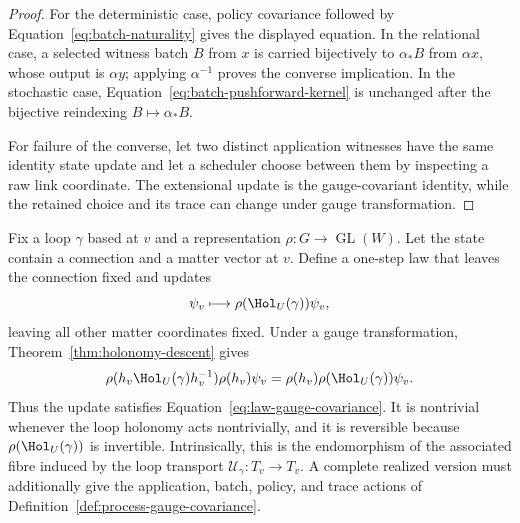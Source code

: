 \begin{proof}
For the deterministic case, policy covariance followed by
Equation~\eqref{eq:batch-naturality} gives the displayed equation.  In the
relational case, a selected witness batch $B$ from $x$ is carried bijectively
to $\alpha_*B$ from $\alpha x$, whose output is $\alpha y$; applying
$\alpha^{-1}$ proves the converse implication.  In the stochastic case,
Equation~\eqref{eq:batch-pushforward-kernel} is unchanged after the bijective
reindexing $B\mapsto\alpha_*B$.

For failure of the converse, let two distinct application witnesses have the
same identity state update and let a scheduler choose between them by
inspecting a raw link coordinate.  The extensional update is the
gauge-covariant identity, while the retained choice and its trace can change
under gauge transformation.
\end{proof}

\begin{example}
Fix a loop $\gamma$ based at $v$ and a representation $\rho:G\to\operatorname{GL}(W)$.
Let the state contain a connection and a matter vector at $v$.  Define a
one-step law that leaves the connection fixed and updates
\[
 \psi_v\longmapsto\rho(\Hol_U(\gamma))\psi_v,
\]
leaving all other matter coordinates fixed.  Under a gauge transformation,
Theorem~\ref{thm:holonomy-descent} gives
\[
 \rho(h_v\Hol_U(\gamma)h_v^{-1})\rho(h_v)\psi_v
 =\rho(h_v)\rho(\Hol_U(\gamma))\psi_v.
\]
Thus the update satisfies Equation~\eqref{eq:law-gauge-covariance}.  It is
nontrivial whenever the loop holonomy acts nontrivially, and it is reversible
because $\rho(\Hol_U(\gamma))$ is invertible.  Intrinsically, this is the
endomorphism of the associated fibre induced by the loop transport
$\mathcal U_\gamma:T_v\to T_v$.  A complete realized version must additionally
give the application, batch, policy, and trace actions of
Definition~\ref{def:process-gauge-covariance}.
\end{example}

